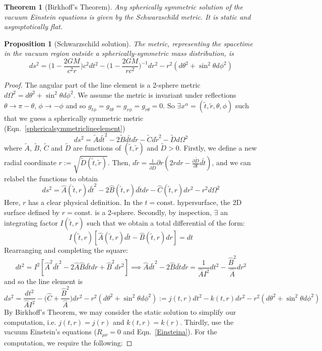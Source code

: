 \documentclass[a4paper]{article}
\theoremstyle{new}
\newtheorem{thm}{Theorem}[section]
\newtheorem{prop}{Proposition}[section]
\begin{document}
\begin{thm}[Birkhoff's Theorem]
Any spherically symmetric solution of the vacuum Einstein equations is given by the Schwarzschild metric. It is static and asymptotically flat.
\end{thm}
\begin{prop}[Schwarzschild solution]
The metric, representing the spacetime in the vacuum region outside a spherically-symmetric mass distribution, is
\begin{equation}
ds^2=\bigg(1-\frac{2GM}{c^2r}\bigg)c^2dt^2-\bigg(1-\frac{2GM}{rc^2}\bigg)^{-1}dr^2-r^2(d\theta^2+\sin^2\theta d\phi^2)\label{Schwarzschild}
\end{equation}
\end{prop}
\begin{proof}
The angular part of the line element is a 2-sphere metric $d\Omega^2=d\theta^2+\sin^2\theta d\phi^2$. We assume the metric is invariant under reflections $\theta\rightarrow\pi-\theta$, $\phi\rightarrow-\phi$ and so $g_{t\phi}=g_{t\theta}=g_{r\phi}=g_{r\theta}=0$. So $\exists x^\alpha=(\tilde{t},\tilde{r},\theta,\phi)$ such that we guess a spherically symmetric metric (Eqn.~\ref{sphericalsymmetriclineelement})
$$ds^2=\tilde{A}d\tilde{t}^2-2\tilde{B}d\tilde{t}d\tilde{r}-\tilde{C}d\tilde{r}^2-\tilde{D}d\Omega^2$$
where $\tilde{A}$, $\tilde{B}$, $\tilde{C}$ and $\tilde{D}$ are functions of $(\tilde{t},\tilde{r})$ and $\tilde{D}>0$. Firstly, we define a new radial coordinate $r:=\sqrt{\tilde{D}(\tilde{t},\tilde{r})}$. Then, $d\tilde{r}=\frac{1}{\partial\tilde{D}}{\partial r}(2rdr-\frac{\partial\tilde{D}}{\partial t}d\tilde{t})$, and we can relabel the functions to obtain
$$ds^2=\hat{A}(\tilde{t},r)d\tilde{t}^2-2\hat{B}(\tilde{t},r)d\tilde{t}dr-\hat{C}(\tilde{t},r)dr^2-r^2d\Omega^2$$
Here, $r$ has a clear physical definition. In the $t=\text{const.}$ hypersurface, the 2D surface defined by $r=\text{const.}$ is a 2-sphere.
Secondly, by inspection, $\exists$ an integrating factor $I(\tilde{t},r)$ such that we obtain a total differential of the form:
$$I(\tilde{t},r)[\hat{A}(\tilde{t},r)d\tilde{t}-\hat{B}(\tilde{t},r)dr]=dt$$
Rearranging and completing the square:
$$dt^2=I^2[\hat{A}^2d\tilde{t}^2-2\hat{A}\hat{B}d\tilde{t}dr+\hat{B}^2dr^2]\implies\hat{A}d\tilde{t}^2-2\hat{B} d\tilde{t} d\tilde{r}=\frac{1}{\hat{A}I^2}dt^2-\frac{\hat{B}^2}{\hat{A}}dr^2$$
and so the line element is
$$ds^2=\frac{dt^2}{\hat{A}I^2}-\bigg(\hat{C}+\frac{\hat{B}^2}{\hat{A}}\bigg)dr^2-r^2(d\theta^2+\sin^2\theta d\phi^2):=j(t,r)dt^2-k(t,r)dr^2-r^2(d\theta^2+\sin^2\theta d\phi^2)$$
By Birkhoff's Theorem, we may consider the static solution to simplify our computation, i.e. $j(t,r)=j(r)$ and $k(t,r)=k(r)$. Thirdly, use the vacuum Einstein's equations ($R_{\mu\nu}=0$ and Eqn.~\ref{Einsteina}). For the computation, we require the following:

\end{proof}
\end{document}

